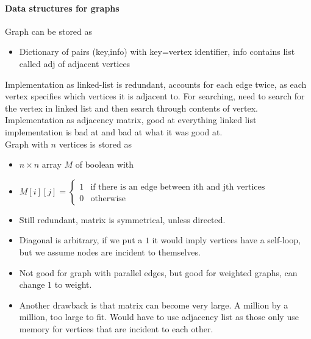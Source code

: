 \documentclass[12 pt]{article}
\theoremstyle{definition}
\begin{document}
\paragraph{Data structures for graphs}
Graph can be stored as
\begin{itemize}
\item Dictionary of pairs (key,info) with key=vertex identifier, info contains list called adj of adjacent vertices
\end{itemize}
Implementation as linked-list is redundant, accounts for each edge twice, as each vertex specifies which vertices it is adjacent to. For searching, need to search for the vertex in linked list and then search through contents of vertex.
\\ Implementation as adjacency matrix, good at everything linked list implementation is bad at and bad at what it was good at.
\\ Graph with $n$ vertices is stored as
\begin{itemize}
\item $n \times n$ array $M$ of boolean with
  \item $M[i][j]=
    \begin{cases}
      1 & \text{if there is an edge between ith and jth vertices}
        \\ 0 & \text{otherwise}
    \end{cases}
    $
    \item Still redundant, matrix is symmetrical, unless directed.
    \item Diagonal is arbitrary, if we put a $1$ it would imply vertices have a self-loop, but we assume nodes are incident to themselves.
    \item Not good for graph with parallel edges, but good for weighted graphs, can change $1$ to weight.
    \item Another drawback is that matrix can become very large. A million by a million, too large to fit. Would have to use adjacency list as those only use memory for vertices that are incident to each other.
\end{itemize}
\end{document}

